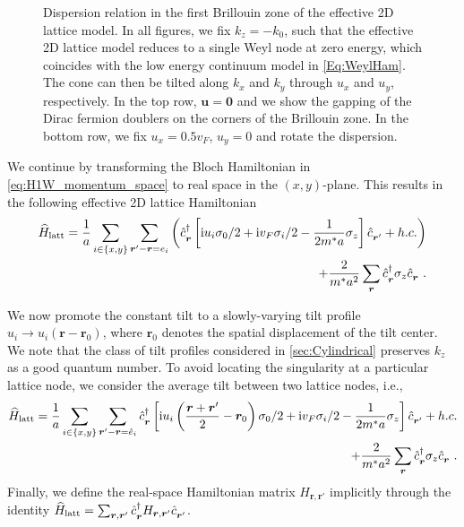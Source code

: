 \documentclass[submission, Phys]{SciPost}
\begin{document}
\begin{figure}[ht]
    \caption{Dispersion relation in the first Brillouin zone of the effective 2D lattice model. In all figures, we fix $k_z=-k_0$, such that the effective 2D lattice model reduces to a single Weyl node at zero energy, which coincides with the low energy continuum model in \cref{Eq:WeylHam}. The cone can then be tilted along $k_x$ and $k_y$ through $u_x$ and $u_y$, respectively. In the top row, $\bm u=\bm 0$ and we show the gapping of the Dirac fermion doublers on the corners of the Brillouin zone. In the bottom row, we fix $u_x=0.5v_F$, $u_y=0$ and rotate the dispersion.}
    \label{fig:lattice_dispersion}
\end{figure}

We continue by transforming the Bloch Hamiltonian in \cref{eq:H1W_momentum_space} to real space in the $(x,y)$-plane.
This results in the following effective 2D lattice Hamiltonian
\begin{align}
    \widehat H_{\rm latt} = \frac1a\sum_{i\in\{x,y\}}\sum_{\bm r'-\bm r=e_i}\left(\hat c^\dag_{\bm r\vphantom'}\left[\ri u_i \sigma_0/2 + \ri v_F\sigma_i/2 - \frac1{2m^*a}\sigma_z\right]\hat c^\pdag_{\bm r'} + h.c.\right)\nonumber\\
    + \frac2{m^*a^2}\sum_{\bm r}\hat c^\dag_{\bm r\vphantom'}\sigma_z\hat c^\pdag_{\bm r}\ .
    \label{eq:H1W}
\end{align}

We now promote the constant tilt to a slowly-varying tilt profile $u_i\rightarrow u_i(\bm r-\bm r_0)$, where $\bm r_0$ denotes the spatial displacement of the tilt center. 
We note that the class of tilt profiles considered in \cref{sec:Cylindrical} preserves $k_z$ as a good quantum number.
To avoid locating the singularity at a particular lattice node, we consider the average tilt between two lattice nodes, i.e.,
\begin{align}
    \widehat H_{\rm latt} = \frac1a\sum_{i\in\{x,y\}}\sum_{\bm r'-\bm r=\hat e_i}\hat c^\dag_{\bm r\vphantom'}\left[\ri u_i\left(\frac{\bm r+\bm r'}2-\bm r_0\right) \sigma_0/2 + \ri v_F\sigma_i/2 - \frac1{2m^*a}\sigma_z\right]\hat c^\pdag_{\bm r'} + h.c.
    \nonumber\\
    + \frac2{m^*a^2}\sum_{\bm r}\hat c^\dag_{\bm r\vphantom'}\sigma_z\hat c^\pdag_{\bm r}\ .
\end{align}
Finally, we define the real-space Hamiltonian matrix $H_{\bm r,\bm r'}$ implicitly through the identity $\widehat H_{\rm latt} = \sum_{\bm r, \bm r'}\hat c^\dag_{\bm r\vphantom'}H_{\bm r,\bm r'}\hat c^\pdag_{\bm r'}$.
\end{document}
